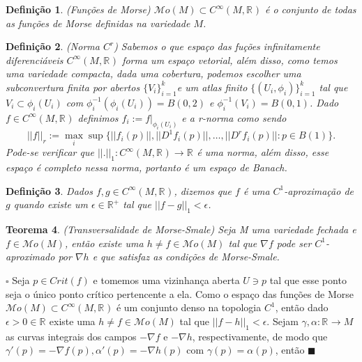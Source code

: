\documentclass[12pt]{book}
\newtheorem{teorema}{Teorema}[section]
\newtheorem{definicao}[teorema]{Definição}
\newenvironment{prova}[1]{$\square$ #1}{\hfill$\blacksquare$}
\newcommand{\funcoessuaves}[1]{C^{\infty}(#1, \real{})}
\newcommand{\pontocritico}[1]{\textit{Crit}(#1)}
\newcommand{\real}[1]{\mathbb{R}^{#1}}
\newcommand{\morsefunc}[1]{\mathcal{M}o(#1)}
\begin{document}
	\begin{definicao}
		(Funções de Morse) $\morsefunc{M} \subset \funcoessuaves{M}$ é o conjunto de todas as funções de Morse definidas na variedade $M$.
	\end{definicao}
	
	\begin{definicao}
		(Norma $C^{r}$) Sabemos o que espaço das fuções infinitamente diferenciáveis $\funcoessuaves{M}$ forma um espaço vetorial, além disso, como temos uma variedade compacta, dada uma cobertura, podemos escolher uma subconvertura finita por abertos $\{V_{i}\}_{i=1}^{k}$e um atlas finito $\{(U_{i}, \phi_{i})\}_{i=1}^{k}$ tal que $V_{i} \subset \phi_{i}(U_{i})$ com $\phi_{i}^{-1}(\phi_{i}(U_{i})) = B(0,2)$ e $\phi_{i}^{-1}(V_{i}) = B(0,1)$. Dado $f \in \funcoessuaves{M}$ definimos $f_{i} := f|_{\phi_{i}(U_{i})}$ e a \textit{r-norma} como sendo 
		$$
		||f||_{r} := \max_{i} \sup\{||f_{i}(p)||, ||D^{1}f_{i}(p)||, \dots, ||D^{r}f_{i}(p)||: p \in B(1)\}.
		$$
		Pode-se verificar que $||.||_{1}: \funcoessuaves{M} \to \real{}$ é uma norma, além disso, esse espaço é completo nessa norma, portanto é um \textit{espaço de Banach}.
	\end{definicao}
	
	\begin{definicao}
		Dados $f, g \in \funcoessuaves{M}$, dizemos que $f$ é uma $C^{1}$-aproximação de $g$ quando existe um $\epsilon \in \real{+}$ tal que $||f-g||_{1} < \epsilon$.
	\end{definicao}
	
	\begin{teorema}
		(Transversalidade de Morse-Smale) Seja M uma variedade fechada e $f \in \morsefunc{M}$, então existe uma $h \neq f \in \morsefunc{M}$ tal que $\nabla f$ pode ser $C^{1}$-aproximado por $\nabla h$ e que satisfaz as condições de Morse-Smale.
	\end{teorema}
	\begin{prova}
		Seja $p \in \pontocritico{f}$ e tomemos uma vizinhança aberta $U \ni p$ tal que esse ponto seja o único ponto crítico pertencente a ela. Como o espaço das funções de Morse $\morsefunc{M} \subset C^{\infty}(M, \real{})$ é um conjunto denso na topologia $C^{1}$, então dado $\epsilon > 0 \in \real{}$ existe uma $h \neq f \in \morsefunc{M}$ tal que $||f-h||_{1} < \epsilon$. Sejam $\gamma, \alpha : \real{} \to M$ as curvas integrais dos campos $-\nabla f$ e $-\nabla h$, respectivamente, de modo que $\gamma'(p) = -\nabla f(p), \alpha'(p) = -\nabla h(p)$ com $\gamma(p) = \alpha(p)$, então
	\end{prova}
\end{document}
